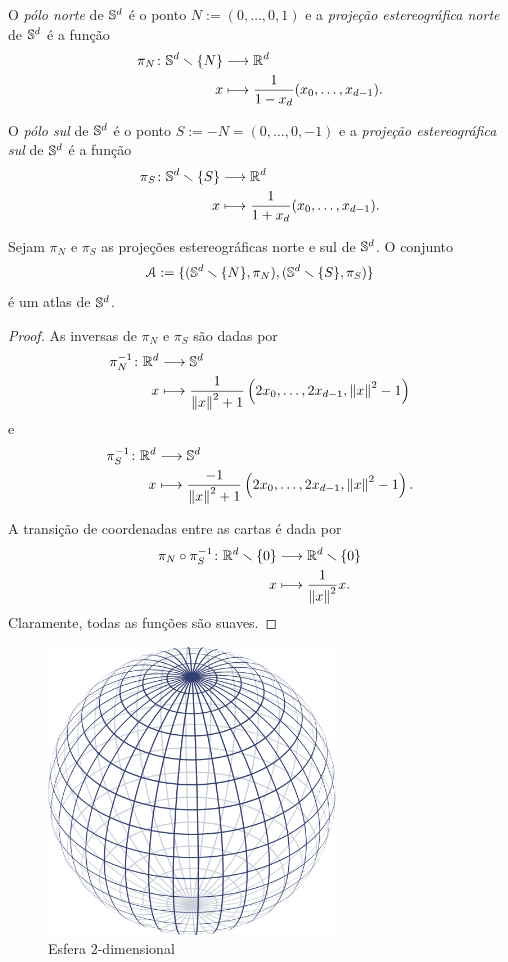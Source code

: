 \begin{definition}
O \emph{pólo norte} de $\S^d$ é o ponto $N := (0,\ldots,0,1)$ e a \emph{projeção estereográfica norte} de $\S^d$ é a função
	\begin{align*}
	\func{\pi_N}{\S^d \setminus\{N\}}{\R^d}{x}{\frac{1}{1-x_d}(x_0,\ldots,x_{d-1})}.
	\end{align*}

O \emph{pólo sul} de $\S^d$ é o ponto $S := -N = (0,\ldots,0,-1)$ e a \emph{projeção estereográfica sul} de $\S^d$ é a função
	\begin{align*}
	\func{\pi_S}{\S^d \setminus\{S\}}{\R^d}{x}{\frac{1}{1+x_d}(x_0,\ldots,x_{d-1})}.
	\end{align*}
\end{definition}

\begin{proposition}
Sejam $\pi_N$ e $\pi_S$ as projeções estereográficas norte e sul de $\S^d$. O conjunto
	\begin{equation*}
	\atlas := \{(\S^d \setminus\{N\},\pi_N),(\S^d \setminus\{S\},\pi_S)\}
	\end{equation*}
é um atlas de $\S^d$.
\end{proposition}
\begin{proof}
As inversas de $\pi_N$ e $\pi_S$ são dadas por
	\begin{align*}
	\func{\pi_N\inv}{\R^d}{\S^d}{x}{\frac{1}{\nor{x}^2 + 1}\left(2x_0,\ldots,2x_{d-1},\nor{x}^2 - 1\right)}
	\end{align*}
e
	\begin{align*}
	\func{\pi_S\inv}{\R^d}{\S^d}{x}{\frac{-1}{\nor{x}^2+1}\left(2x_0,\ldots,2x_{d-1},\nor{x}^2-1\right)}.
	\end{align*}

A transição de coordenadas entre as cartas é dada por
	\begin{align*}
	\func{\pi_N \circ \pi_S\inv}{\R^d \setminus\{0\}}{\R^d \setminus\{0\}}{x}{\frac{1}{\nor{x}^2}x}.
	\end{align*}
Claramente, todas as funções são suaves.
\end{proof}

\begin{figure}[!h]
\centering
\includegraphics[width=3in]{./imagens/esfera}
\caption{Esfera $2$-dimensional}
\end{figure}

